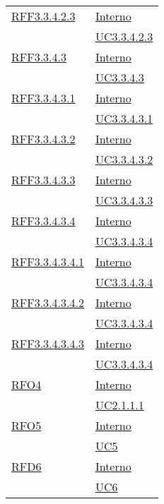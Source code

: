 \begin{longtable}{|>{\centering}m{5cm}|m{5cm}<{\centering}|}
\hyperlink{RFF3.3.4.2.3}{RFF3.3.4.2.3} & \hyperlink{Interno}{Interno}\\
& \hyperref[UC3.3.4.2.3]{UC3.3.4.2.3}\\ \hline

\hyperlink{RFF3.3.4.3}{RFF3.3.4.3} & \hyperlink{Interno}{Interno}\\
& \hyperref[UC3.3.4.3]{UC3.3.4.3}\\ \hline

\hyperlink{RFF3.3.4.3.1}{RFF3.3.4.3.1} & \hyperlink{Interno}{Interno}\\
& \hyperref[UC3.3.4.3.1]{UC3.3.4.3.1}\\ \hline

\hyperlink{RFF3.3.4.3.2}{RFF3.3.4.3.2} & \hyperlink{Interno}{Interno}\\
& \hyperref[UC3.3.4.3.2]{UC3.3.4.3.2}\\ \hline

\hyperlink{RFF3.3.4.3.3}{RFF3.3.4.3.3} & \hyperlink{Interno}{Interno}\\
& \hyperref[UC3.3.4.3.3]{UC3.3.4.3.3}\\ \hline

\hyperlink{RFF3.3.4.3.4}{RFF3.3.4.3.4} & \hyperlink{Interno}{Interno}\\
& \hyperref[UC3.3.4.3.4]{UC3.3.4.3.4}\\ \hline

\hyperlink{RFF3.3.4.3.4.1}{RFF3.3.4.3.4.1} & \hyperlink{Interno}{Interno}\\
& \hyperref[UC3.3.4.3.4]{UC3.3.4.3.4}\\ \hline

\hyperlink{RFF3.3.4.3.4.2}{RFF3.3.4.3.4.2} & \hyperlink{Interno}{Interno}\\
& \hyperref[UC3.3.4.3.4]{UC3.3.4.3.4}\\ \hline

\hyperlink{RFF3.3.4.3.4.3}{RFF3.3.4.3.4.3} & \hyperlink{Interno}{Interno}\\
& \hyperref[UC3.3.4.3.4]{UC3.3.4.3.4}\\ \hline

\hyperlink{RFO4}{RFO4} & \hyperlink{Interno}{Interno}\\
& \hyperref[UC2.1.1.1]{UC2.1.1.1}\\ \hline

\hyperlink{RFO5}{RFO5} & \hyperlink{Interno}{Interno}\\
& \hyperref[UC5]{UC5}\\ \hline

\hyperlink{RFD6}{RFD6} & \hyperlink{Interno}{Interno}\\
& \hyperref[UC6]{UC6}\\ \hline


\end{longtable}
